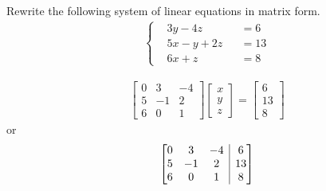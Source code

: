 \begin{Exercise}
Rewrite the following system of linear equations in matrix form.
\begin{align*}
\left\{\begin{alignedat}{2}
&3y - 4z& &= 6\\
&5x - y + 2z& &= 13\\
&6x + z& &= 8
\end{alignedat}\right.
\end{align*}
\end{Exercise}
\begin{Answer}
\begin{align*}
\begin{bmatrix}
0 & 3 & -4 \\
5 & -1 & 2 \\
6 & 0 & 1
\end{bmatrix}
\begin{bmatrix}
x \\
y \\
z
\end{bmatrix}
=
\begin{bmatrix}
6 \\ 
13 \\
8
\end{bmatrix}    
\end{align*}
or
\begin{align*}
\left[\begin{array}{@{}ccc|c@{}}
0 & 3 & -4 & 6 \\
5 & -1 & 2 & 13 \\
6 & 0 & 1 & 8
\end{array}\right]    
\end{align*}
\end{Answer}

